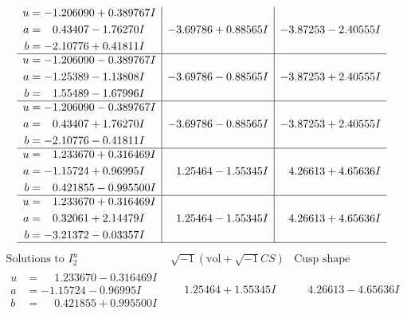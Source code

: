 \documentclass[1p]{elsarticle_modified}
\theoremstyle{definition}
\newcommand{\I}{\sqrt{-1}}
\begin{document}
$$\begin{array}{c|c|c}
\begin{aligned}
u &= -1.206090 + 0.389767 I \\
a &= \phantom{-}0.43407 - 1.76270 I \\
b &= -2.10776 + 0.41811 I\end{aligned}
 & -3.69786 + 0.88565 I & -3.87253 - 2.40555 I \\ \hline\begin{aligned}
u &= -1.206090 - 0.389767 I \\
a &= -1.25389 - 1.13808 I \\
b &= \phantom{-}1.55489 - 1.67996 I\end{aligned}
 & -3.69786 - 0.88565 I & -3.87253 + 2.40555 I \\ \hline\begin{aligned}
u &= -1.206090 - 0.389767 I \\
a &= \phantom{-}0.43407 + 1.76270 I \\
b &= -2.10776 - 0.41811 I\end{aligned}
 & -3.69786 - 0.88565 I & -3.87253 + 2.40555 I \\ \hline\begin{aligned}
u &= \phantom{-}1.233670 + 0.316469 I \\
a &= -1.15724 + 0.96995 I \\
b &= \phantom{-}0.421855 - 0.995500 I\end{aligned}
 & \phantom{-}1.25464 - 1.55345 I & \phantom{-}4.26613 + 4.65636 I \\ \hline\begin{aligned}
u &= \phantom{-}1.233670 + 0.316469 I \\
a &= \phantom{-}0.32061 + 2.14479 I \\
b &= -3.21372 - 0.03357 I\end{aligned}
 & \phantom{-}1.25464 - 1.55345 I & \phantom{-}4.26613 + 4.65636 I\\
 \hline 
 \end{array}$$\newpage$$\begin{array}{c|c|c}  
\text{Solutions to }I^u_{2}& \I (\text{vol} + \sqrt{-1}CS) & \text{Cusp shape}\\
 \hline 
\begin{aligned}
u &= \phantom{-}1.233670 - 0.316469 I \\
a &= -1.15724 - 0.96995 I \\
b &= \phantom{-}0.421855 + 0.995500 I\end{aligned}
 & \phantom{-}1.25464 + 1.55345 I & \phantom{-}4.26613 - 4.65636 I \\ \hline\begin{aligned}

\end{aligned}
\end{array}$$
\end{document}
